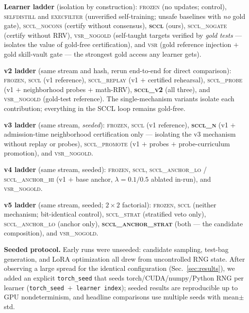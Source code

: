 \documentclass[10pt,conference]{IEEEtran}
\begin{document}
\textbf{Learner ladder} (isolation by construction): \textsc{frozen} (no updates; control), \textsc{selfdistill} and \textsc{execfilter} (unverified self-training; unsafe baselines with \emph{no} gold gate), \textsc{sccl\_nocons} (certify without consensus), \textbf{\textsc{sccl}} (ours), \textsc{sccl\_nogate} (certify without RRV), \textsc{vsr\_nogold} (self-taught targets verified by \emph{gold tests} --- isolates the value of gold-free certification), and \textsc{vsr} (gold reference injection $+$ gold skill-vault gate --- the strongest gold access any learner gets).

\textbf{v2 ladder} (same stream and hash, rerun end-to-end for direct comparison): \textsc{frozen}, \textsc{sccl} (v1 reference), \textsc{sccl\_replay} (v1 $+$ certified rehearsal), \textsc{sccl\_probe} (v1 $+$ neighborhood probes $+$ math-RRV), \textbf{\textsc{sccl\_v2}} (all three), and \textsc{vsr\_nogold} (gold-test reference). The single-mechanism variants isolate each contribution; everything in the SCCL loop remains gold-free.

\textbf{v3 ladder} (same stream, \emph{seeded}): \textsc{frozen}, \textsc{sccl} (v1 reference), \textbf{\textsc{sccl\_n}} (v1 $+$ admission-time neighborhood certification only --- isolating the v3 mechanism without replay or probes), \textsc{sccl\_promote} (v1 $+$ probes $+$ probe-curriculum promotion), and \textsc{vsr\_nogold}.

\textbf{v4 ladder} (same stream, seeded): \textsc{frozen}, \textsc{sccl}, \textsc{sccl\_anchor\_lo} / \textsc{sccl\_anchor\_hi} (v1 $+$ base anchor, $\lambda = 0.1/0.5$ ablated in-run), and \textsc{vsr\_nogold}.

\textbf{v5 ladder} (same stream, seeded; $2\times2$ factorial): \textsc{frozen}, \textsc{sccl} (neither mechanism; bit-identical control), \textsc{sccl\_strat} (stratified veto only), \textsc{sccl\_anchor\_lo} (anchor only), \textbf{\textsc{sccl\_anchor\_strat}} (both --- the candidate composition), and \textsc{vsr\_nogold}.

\textbf{Seeded protocol.} Early runs were unseeded: candidate sampling, test-bag generation, and LoRA optimization all drew from uncontrolled RNG state. After observing a large spread for the identical configuration (Sec.~\ref{sec:results}), we added an explicit \texttt{torch\_seed} that seeds torch/CUDA/numpy/Python RNG per learner (\texttt{torch\_seed $+$ learner index}); seeded results are reproducible up to GPU nondeterminism, and headline comparisons use multiple seeds with mean$\pm$std.
\end{document}
